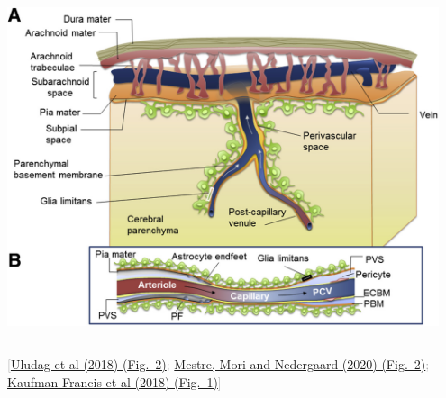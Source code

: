 \documentclass[mathserif, aspectratio=169]{beamer}
\newcommand{\refer}[1]{\begin{flushright}{\tiny \textcolor{darkgray}{[#1]}}\end{flushright}}
\begin{document}
\begin{frame}
\begin{columns}[c]
\begin{column}{0.6\textwidth}
\begin{center}
        \includegraphics[width=0.95\textwidth]{graphics/kaufmanfrancis_et_al_2018_fig1.jpg}
      \end{center}
      \end{column}
  \end{columns}
  \refer{\href{https://doi.org/10.1016/j.neuroimage.2017.02.063}{Uludag et al (2018) (Fig.~2)}; \href{https://doi.org/10.1016/j.tins.2020.04.003}{Mestre, Mori and Nedergaard (2020) (Fig.~2)}; \href{https://doi.org/10.1016/j.ajpath.2018.03.015}{Kaufman-Francis et al (2018) (Fig.~1)}}
\end{frame}
\end{document}
